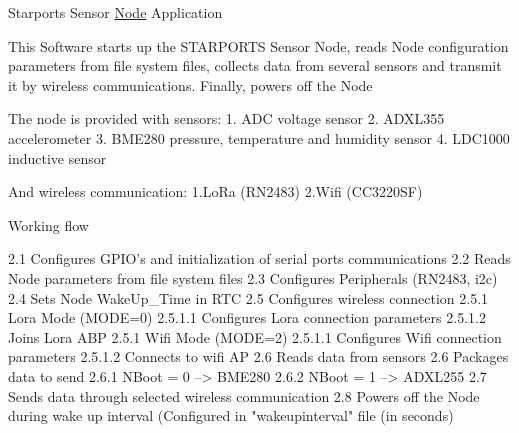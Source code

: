 
\begin{DoxyEnumerate}
\item Starports Sensor \mbox{\hyperlink{_s_t_a_r_p_o_r_t_s___app_8h_struct_node}{Node}} Application \begin{DoxyVerb}    This Software starts up the STARPORTS Sensor Node, reads Node configuration parameters from file system files,
    collects data from several sensors and transmit it by wireless communications. Finally, powers off the Node

    The node is provided with sensors:
        1. ADC voltage sensor
        2. ADXL355 accelerometer
        3. BME280 pressure, temperature and humidity sensor
        4. LDC1000 inductive sensor

    And wireless communication:
        1.LoRa (RN2483)
        2.Wifi (CC3220SF)
\end{DoxyVerb}

\item Working flow \begin{DoxyVerb}    2.1 Configures GPIO's and initialization of serial ports communications
    2.2 Reads Node parameters from file system files
    2.3 Configures Peripherals (RN2483, i2c)
    2.4 Sets Node WakeUp_Time in RTC
    2.5 Configures wireless connection
        2.5.1 Lora Mode (MODE=0)
            2.5.1.1 Configures Lora connection parameters
            2.5.1.2 Joins Lora ABP
        2.5.1 Wifi Mode (MODE=2)
            2.5.1.1 Configures Wifi connection parameters
            2.5.1.2 Connects to wifi AP
    2.6 Reads data from sensors
    2.6 Packages data to send
        2.6.1 NBoot = 0 --> BME280
        2.6.2 NBoot = 1 --> ADXL255
    2.7 Sends data through selected wireless communication
    2.8 Powers off the Node during wake up interval (Configured in "wakeupinterval" file (in seconds)
\end{DoxyVerb}
 
\end{DoxyEnumerate}